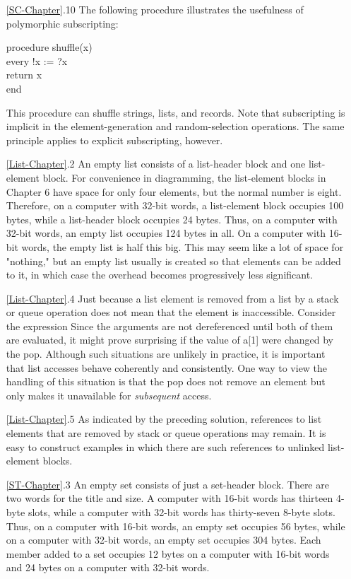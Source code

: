 \begin{itemize}
\goodbreak\item[\ref*{SC-Chapter}.10]
The following procedure illustrates the usefulness of polymorphic subscripting:
\begin{iconcode}
procedure shuffle(x)\\
\>every !x := ?x\\
\>return x\\
end
\end{iconcode}
This procedure can shuffle strings, lists, and records. Note that subscripting
is implicit in the element-generation and random-selection operations.
The same principle applies to explicit subscripting, however.

\goodbreak\item[\ref*{List-Chapter}.2]
An empty list consists of a list-header block and one list-element block.
For convenience in diagramming, the list-element blocks in Chapter 6
have space for only four elements, but the normal number is eight. Therefore,
on a computer with 32-bit words, a list-element block occupies 100
bytes, while a list-header block occupies 24 bytes. Thus, on a computer
with 32-bit words, an empty list occupies 124 bytes in all. On a computer
with 16-bit words, the empty list is half this big. This may seem like a lot
of space for "nothing," but an empty list usually is created so that elements
can be added to it, in which case the overhead becomes progressively
less significant.

\goodbreak\item[\ref*{List-Chapter}.4]
Just because a list element is removed from a list by a stack or queue
operation does not mean that the element is inaccessible. Consider the
expression
Since the arguments are not dereferenced until both of them are
evaluated, it might prove surprising if the value of a[1] were changed by
the pop. Although such situations are unlikely in practice, it is important
that list accesses behave coherently and consistently. One way to view
the handling of this situation is that the pop does not remove an element
but only makes it unavailable for {\em subsequent} access.

\goodbreak\item[\ref*{List-Chapter}.5]
As indicated by the preceding solution, references to list elements that are
removed by stack or queue operations may remain. It is easy to construct
examples in which there are such references to unlinked list-element
blocks.

\goodbreak\item[\ref*{ST-Chapter}.3]
An empty set consists of just a set-header block. There are two words for
the title and size. A computer with 16-bit words has thirteen 4-byte slots,
while a computer with 32-bit words has thirty-seven 8-byte slots. Thus,
on a computer with 16-bit words, an empty set occupies 56 bytes, while
on a computer with 32-bit words, an empty set occupies 304 bytes. Each
member added to a set occupies 12 bytes on a computer with 16-bit words
and 24 bytes on a computer with 32-bit words.


\end{itemize}
